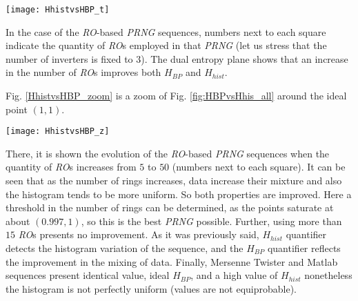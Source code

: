 \begin{figure*}
\begin{center}
\texttt{[image: HhistvsHBP\_t]}
\caption{$H_{BP}$ vs $H_{hist}$ plane for several noises, numbers next to each square indicate the quantity of \emph{RO}s
used in the \emph{RO} based \emph{PRNG}. Numbers next to each point in the  chaotic sequences labeled \emph{Logistic}
and \emph{TWBM} indicate the number of iteration of the chaotic map (see the text for details).}
\label{fig:HBPvsHhis_all}
\end{center}
\end{figure*}

In the case of the \emph{RO}-based \emph{PRNG} sequences, numbers next to each square indicate the quantity of \emph{RO}s employed in that \emph{PRNG} (let us stress that the number of inverters is fixed to $3$). The dual entropy plane shows that  an increase in the number of \emph{RO}s improves both $H_{BP}$ and $H_{hist}$.

Fig. \ref{HhistvsHBP_zoom} is a zoom of Fig. \ref{fig:HBPvsHhis_all}  around the ideal point $(1,1)$.


\begin{figure*}
\begin{center}
\texttt{[image: HhistvsHBP\_z]}
\caption{Zoom of Fig. \ref{fig:HBPvsHhis_all}  around the ideal point $(1,1)$ of the $H_{BP}$ vs $H_{hist}$ plane. Numbers next to each square indicate the number of \emph{RO}s used in that rings-based \emph{PRNG}. Numbers next to each point in the chaotic sequences indicate the number of iteration of the chaotic map.} \label{HhistvsHBP_zoom}
\end{center}
\end{figure*}

There, it is shown the evolution of the \emph{RO}-based \emph{PRNG} sequences when the quantity of \emph{RO}s increases from $5$ to $50$ (numbers next to each square). It can be seen that as the number of rings increases, data increase their mixture and also the histogram tends to be more uniform. So both properties are improved. Here a threshold in the number of rings can be determined, as the points saturate at about $(0.997,1)$, so this is the best \emph{PRNG} possible. Further, using more than $15$ \emph{RO}s presents no improvement.
As it was previously said, $H_{hist}$ quantifier detects the histogram variation of the sequence, and the $H_{BP}$ quantifier reflects the improvement in the mixing of data.
Finally, Mersenne Twister and Matlab sequences present identical value, ideal $H_{BP}$, and a high value of $H_{hist}$ nonetheless the histogram is not perfectly uniform (values are not equiprobable).

